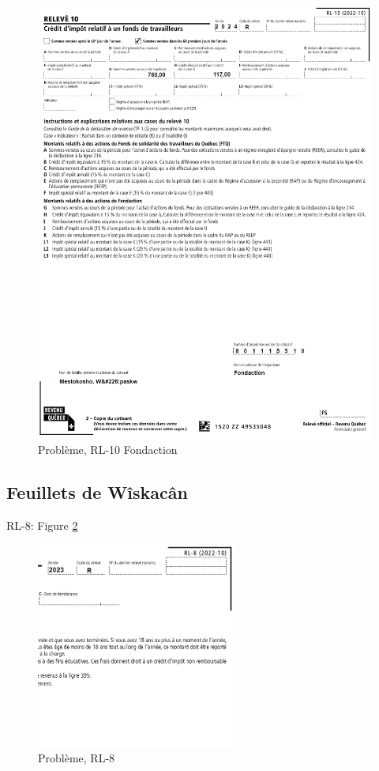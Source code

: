 \begin{figure}
	\centering
	\includegraphics[width=.9\textwidth]{probleme/chapitre-5/Wapaskw-RL10-Fondaction.png}
	\caption[]{Problème, RL-10 Fondaction}
	\label{fig:chap5ProblemeRL10Fondaction}
\end{figure}


\subsection{Feuillets de Wîskacân}
RL-8: Figure \ref{fig:chap5ProblemeRL8}
\begin{figure}
	\centering
	\includegraphics[width=.9\textwidth]{probleme/chapitre-5/Wiskacan-RL8.png}
	\caption[]{Problème, RL-8}
	\label{fig:chap5ProblemeRL8}
\end{figure}



